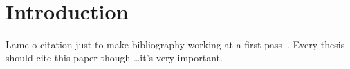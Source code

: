 \documentclass[12pt]{drexelthesis}
\begin{document}
                                                                                                
\thispagestyle{empty}
\newpage
\

\setcounter{page}{0}



\chapter{Introduction}
\label{chap:introduction}

Lame-o citation just to make bibliography working at a first pass~\cite{CERA:CGA:2002}.  Every thesis should cite this paper though \ldots it's very important.


\pagebreak
{}
\begin{spacing}{1.0}


\end{spacing}

\newpage
\thispagestyle{empty}
\
                                                                                                
\end{document}
